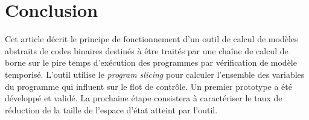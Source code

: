 \section{Conclusion}
\label{sec:conclusion}


  Cet article décrit le principe de fonctionnement d'un outil de calcul de
  modèles abstraits de codes binaires destinés à être traités par une chaîne de
  calcul de borne sur le pire temps d'exécution des programmes par vérification
  de modèle temporisé.  L'outil utilise le \emph{program slicing} pour calculer
  l'ensemble des variables du programme qui influent sur le flot de contrôle.
  Un premier prototype a été développé et validé.  La prochaine étape
  consistera à caractériser le taux de réduction de la taille de l'espace
  d'état atteint par l'outil.




